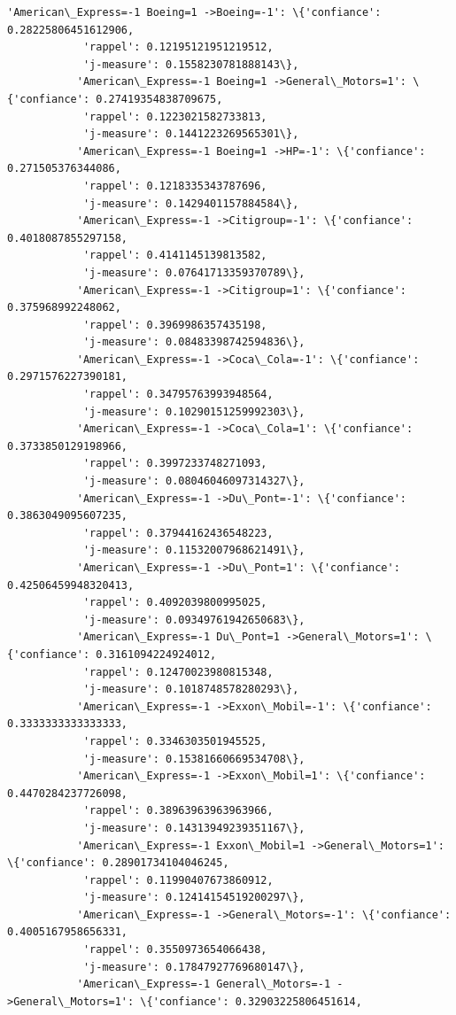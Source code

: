 \documentclass[11pt]{article}
\begin{document}
\begin{Verbatim}[commandchars=\\\{\}]
           'American\_Express=-1 Boeing=1 ->Boeing=-1': \{'confiance': 0.28225806451612906,
            'rappel': 0.12195121951219512,
            'j-measure': 0.1558230781888143\},
           'American\_Express=-1 Boeing=1 ->General\_Motors=1': \{'confiance': 0.27419354838709675,
            'rappel': 0.1223021582733813,
            'j-measure': 0.1441223269565301\},
           'American\_Express=-1 Boeing=1 ->HP=-1': \{'confiance': 0.271505376344086,
            'rappel': 0.1218335343787696,
            'j-measure': 0.1429401157884584\},
           'American\_Express=-1 ->Citigroup=-1': \{'confiance': 0.4018087855297158,
            'rappel': 0.4141145139813582,
            'j-measure': 0.07641713359370789\},
           'American\_Express=-1 ->Citigroup=1': \{'confiance': 0.375968992248062,
            'rappel': 0.3969986357435198,
            'j-measure': 0.08483398742594836\},
           'American\_Express=-1 ->Coca\_Cola=-1': \{'confiance': 0.2971576227390181,
            'rappel': 0.34795763993948564,
            'j-measure': 0.10290151259992303\},
           'American\_Express=-1 ->Coca\_Cola=1': \{'confiance': 0.3733850129198966,
            'rappel': 0.3997233748271093,
            'j-measure': 0.08046046097314327\},
           'American\_Express=-1 ->Du\_Pont=-1': \{'confiance': 0.3863049095607235,
            'rappel': 0.37944162436548223,
            'j-measure': 0.11532007968621491\},
           'American\_Express=-1 ->Du\_Pont=1': \{'confiance': 0.42506459948320413,
            'rappel': 0.4092039800995025,
            'j-measure': 0.09349761942650683\},
           'American\_Express=-1 Du\_Pont=1 ->General\_Motors=1': \{'confiance': 0.3161094224924012,
            'rappel': 0.12470023980815348,
            'j-measure': 0.1018748578280293\},
           'American\_Express=-1 ->Exxon\_Mobil=-1': \{'confiance': 0.3333333333333333,
            'rappel': 0.3346303501945525,
            'j-measure': 0.15381660669534708\},
           'American\_Express=-1 ->Exxon\_Mobil=1': \{'confiance': 0.4470284237726098,
            'rappel': 0.38963963963963966,
            'j-measure': 0.14313949239351167\},
           'American\_Express=-1 Exxon\_Mobil=1 ->General\_Motors=1': \{'confiance': 0.28901734104046245,
            'rappel': 0.11990407673860912,
            'j-measure': 0.12414154519200297\},
           'American\_Express=-1 ->General\_Motors=-1': \{'confiance': 0.4005167958656331,
            'rappel': 0.3550973654066438,
            'j-measure': 0.17847927769680147\},
           'American\_Express=-1 General\_Motors=-1 ->General\_Motors=1': \{'confiance': 0.32903225806451614,

\end{Verbatim}
\end{document}
